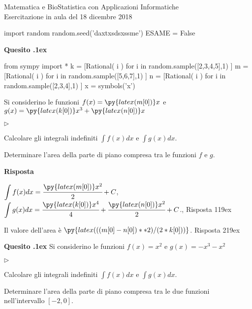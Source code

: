 \documentclass[11pt,twoside,a4paper]{article}
\newcommand{\mylabel}[1]{#1\hfill}
\renewenvironment{itemize}
  {\begin{list}{$\triangleright$}{%
   \setlength{\parskip}{0mm}
   \setlength{\topsep}{.4\baselineskip}
   \setlength{\rightmargin}{0mm}
   \setlength{\listparindent}{0mm}
   \setlength{\itemindent}{0mm}
   \setlength{\labelwidth}{2ex}
   \setlength{\itemsep}{.4\baselineskip}
   \setlength{\parsep}{0mm}
   \setlength{\partopsep}{0mm}
   \setlength{\labelsep}{1ex}
   \setlength{\leftmargin}{\labelwidth+\labelsep}
   \let\makelabel\mylabel}}{%
   \end{list}\vspace*{-1.3mm}}
\newcounter{quesito}
\newenvironment{question}{\addtocounter{quesito}{1}\par\textbf{Quesito \thequesito.\kern1ex}}{\vspace{0.5\parskip}}
\newenvironment{answer}{\par\textbf{Risposta\quad}}{\vspace{\parskip}}
\begin{document}
\colorbox{blue!10}{\begin{minipage}{\textwidth}
Matematica e BioStatistica con Applicazioni Informatiche\\
Esercitazione in aula del 18 dicembre 2018
\end{minipage}}



\begin{pycode}
import random
random.seed('daxtxsdsxssme')
ESAME = False
\end{pycode}

\begin{question}
\begin{pycode}
from sympy import *
k = [Rational( i ) for i in random.sample([2,3,4,5],1) ]
m = [Rational( i ) for i in random.sample([5,6,7],1) ]
n = [Rational( i ) for i in random.sample([2,3,4],1) ]
x = symbols('x')
\end{pycode}
Si considerino le funzioni $f(x) = \py{latex(m[0])} x$ e $g(x) = \py{latex(k[0])} x^3 + \py{latex(n[0])} x$
\begin{itemize}
\item[1.] Calcolare gli integrali indefiniti $\displaystyle \int f(x) dx$ e $\displaystyle \int g(x) dx$.
\item[2.] Determinare l'area della parte di piano compresa tra le funzioni $f$ e $g$.
\end{itemize}
\begin{answer}

{\color{blue} $\displaystyle \int f(x) dx = \cfrac{\py{latex(m[0])} x^2}{2} + C$, $\displaystyle \int g(x) dx = \cfrac{\py{latex(k[0])}x^4}{4} +\cfrac{\py{latex(n[0])} x^2}{2} + C$.,  \hfill Risposta 1\kern19ex}

\smallskip
{\color{blue} Il valore dell'area è $\py{latex(((m[0]-n[0])**2)/(2*k[0]))}$.
\hfill Risposta 2\kern19ex}

\end{answer}
\end{question}
\begin{question}
Si considerino le funzioni $f(x) = x^2$ e $g(x) = -x^3 - x^2$
\begin{itemize}
\item[1.] Calcolare gli integrali indefiniti $\displaystyle \int f(x) dx$ e $\displaystyle \int g(x) dx$.
\item[2.] Determinare l'area della parte di piano compresa tra le due funzioni nell'intervallo $[-2, 0]$.
\end{itemize}
\end{question}
\end{document}
